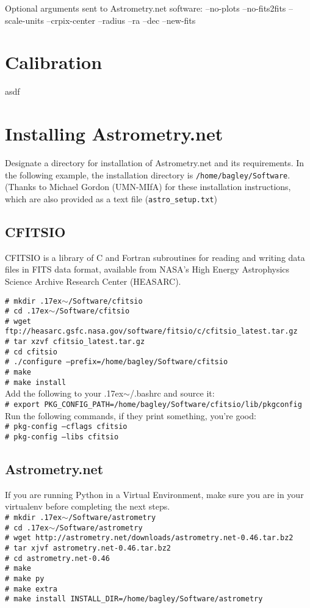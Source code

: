 \documentclass{article}
\newcommand{\ttsim}{\raise.17ex\hbox{$\scriptstyle\mathtt{\sim}$}}
\newcommand{\shellcmd}[1]{\indent\indent\texttt{\footnotesize\# #1}\\}
\begin{document}
Optional arguments sent to Astrometry.net software:
--no-plots
--no-fits2fits
--scale-units
--crpix-center
--radius
--ra 
--dec
--new-fits




\section{Calibration}
asdf

\appendix
\section{Installing Astrometry.net}
Designate a directory for installation of Astrometry.net and its requirements.
In the following example, the installation directory is
\texttt{/home/bagley/Software}. \\

\noindent (Thanks to Michael Gordon (UMN-MIfA) for these installation 
instructions, which are also provided as a text file (\texttt{astro\_setup.txt})

\subsection{CFITSIO}
CFITSIO is a library of C and Fortran subroutines for reading and writing
data files in FITS data format, available from NASA's High Energy
Astrophysics Science Archive Research Center (HEASARC). 

\shellcmd{mkdir \ttsim/Software/cfitsio}
\shellcmd{cd \ttsim/Software/cfitsio}
\shellcmd{wget ftp://heasarc.gsfc.nasa.gov/software/fitsio/c/cfitsio\_latest.tar.gz}
\shellcmd{tar xzvf cfitsio\_latest.tar.gz}
\shellcmd{cd cfitsio}
\shellcmd{./configure --prefix=/home/bagley/Software/cfitsio}
\shellcmd{make}
\shellcmd{make install}

\noindent Add the following to your \ttsim/.bashrc and source it: \\
\shellcmd{export PKG\_CONFIG\_PATH=/home/bagley/Software/cfitsio/lib/pkgconfig}

\noindent Run the following commands, if they print something, you're good: \\
\shellcmd{pkg-config --cflags cfitsio}
\shellcmd{pkg-config --libs cfitsio}

\subsection{Astrometry.net}
If you are running Python in a Virtual Environment, make sure you are 
in your virtualenv before completing the next steps. \\
\shellcmd{mkdir \ttsim/Software/astrometry}
\shellcmd{cd \ttsim/Software/astrometry}
\shellcmd{wget http://astrometry.net/downloads/astrometry.net-0.46.tar.bz2}
\shellcmd{tar xjvf astrometry.net-0.46.tar.bz2}
\shellcmd{cd astrometry.net-0.46}
\shellcmd{make}
\shellcmd{make py}
\shellcmd{make extra}
\shellcmd{make install INSTALL\_DIR=/home/bagley/Software/astrometry}
\end{document}
